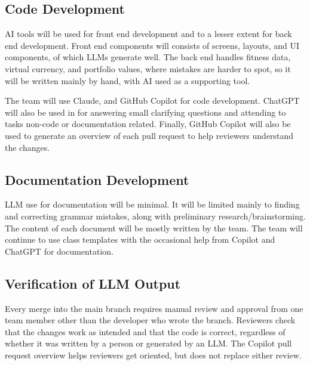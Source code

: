 \documentclass{article}
\begin{document}

\subsection{Code Development}

AI tools will be used for front end development and to a lesser extent
for back end development. Front end components will consists of screens, layouts,
and UI components, of which LLMs generate well. The back end handles fitness data,
virtual currency, and portfolio values, where mistakes are harder to spot, so
it will be written mainly by hand, with AI used as a supporting tool.

The team will use Claude, and GitHub Copilot for code
development. ChatGPT will also be used in for answering small clarifying questions 
and attending to tasks non-code or documentation related.
Finally, GitHub Copilot will also be used to generate an overview of each
pull request to help reviewers understand the changes.

\subsection{Documentation Development}

LLM use for documentation will be minimal. It will be limited mainly to finding
and correcting grammar mistakes, along with preliminary research/brainstorming. The content of each document will be mostly written by
the team. The team will continue to use class templates with the occasional help from Copilot and ChatGPT for documentation.

\subsection{Verification of LLM Output}

Every merge into the main branch requires manual review and approval from one
team member other than the developer who wrote the branch. Reviewers check
that the changes work as intended and that the code is correct, regardless of
whether it was written by a person or generated by an LLM. The Copilot pull
request overview helps reviewers get oriented, but does not replace either
review.
\end{document}
